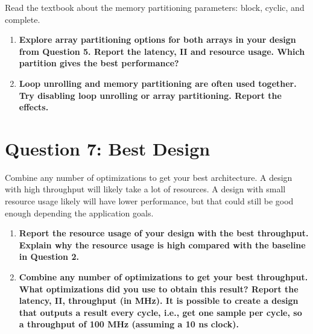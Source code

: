\documentclass[12pt,a4paper]{article}
\begin{document}
 Read the textbook about the memory partitioning parameters: block, cyclic, and complete.

\begin{enumerate}
    \item[(a)] \textbf{Explore array partitioning options for both arrays in your design from Question 5. Report the latency, II and resource usage. Which partition gives the best performance?}
    \item[(b)] \textbf{Loop unrolling and memory partitioning are often used together. Try disabling loop unrolling or array partitioning. Report the effects.}
\end{enumerate}


\section*{Question 7: Best Design}

Combine any number of optimizations to get your best architecture.
A design with high throughput will likely take a lot of resources.
A design with small resource usage likely will have lower performance, but that could still be good enough depending the application goals.

\begin{enumerate}
    \item[(b)] \textbf{Report the resource usage of your design with the best throughput. Explain why the resource usage is high compared with the baseline in Question 2.}
    \item[(a)] \textbf{Combine any number of optimizations to get your best throughput. What optimizations did you use to obtain this result? Report the latency, II, throughput (in MHz). It is possible to create a design that outputs a result every cycle, i.e., get one sample per cycle, so a throughput of 100 MHz (assuming a 10 ns clock).}
\end{enumerate}
\end{document}
